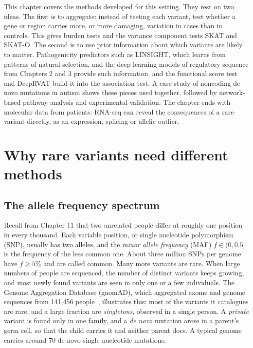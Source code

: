This chapter covers the methods developed for this setting. They rest on two ideas. The first is to aggregate: instead of testing each variant, test whether a gene or region carries more, or more damaging, variation in cases than in controls. This gives burden tests and the variance component tests SKAT and SKAT-O. The second is to use prior information about which variants are likely to matter. Pathogenicity predictors such as LINSIGHT, which learns from patterns of natural selection, and the deep learning models of regulatory sequence from Chapters 2 and 3 provide such information, and the functional score test and DeepRVAT build it into the association test. A case study of noncoding de novo mutations in autism shows these pieces used together, followed by network-based pathway analysis and experimental validation. The chapter ends with molecular data from patients: RNA-seq can reveal the consequences of a rare variant directly, as an expression, splicing or allelic outlier.

\section{Why rare variants need different methods}
\label{sec:why_rare}

\subsection{The allele frequency spectrum}

Recall from Chapter 11 that two unrelated people differ at roughly one position in every thousand. Each variable position, or single nucleotide polymorphism (SNP), usually has two alleles, and the \emph{minor allele frequency} (MAF) $f\in(0,0.5]$ is the frequency of the less common one. About three million SNPs per genome have $f\geq 5\%$ and are called common. Many more variants are rare. When large numbers of people are sequenced, the number of distinct variants keeps growing, and most newly found variants are seen in only one or a few individuals. The Genome Aggregation Database (gnomAD), which aggregated exome and genome sequences from 141,456 people~\citep{karczewski2020}, illustrates this: most of the variants it catalogues are rare, and a large fraction are \emph{singletons}, observed in a single person. A \emph{private} variant is found only in one family, and a \emph{de novo} mutation arose in a parent's germ cell, so that the child carries it and neither parent does. A typical genome carries around 70 de novo single nucleotide mutations.

